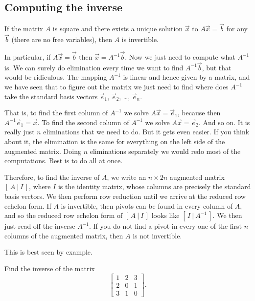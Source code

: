 \subsection{Computing the inverse}

If the matrix $A$ is square and there exists a unique solution
$\vec{x}$ to $A \vec{x} = \vec{b}$ for any $\vec{b}$ (there are no free
variables), then $A$ is invertible.

In particular, if $A \vec{x} = \vec{b}$ then $\vec{x} = A^{-1} \vec{b}$.
Now we just need to compute what $A^{-1}$ is.  We can surely 
do elimination every time we want to find $A^{-1} \vec{b}$, but that
would be ridiculous.  The mapping $A^{-1}$ is linear and
hence given by a matrix, and we have seen that to figure out the matrix
we just need to find where does $A^{-1}$ take the standard basis vectors
$\vec{e}_1$, 
$\vec{e}_2$, \ldots,
$\vec{e}_n$.

That is, to find the first column of $A^{-1}$ we solve
$A \vec{x} = \vec{e}_1$, because then $A^{-1} \vec{e}_1 = \vec{x}$.
To find the second column of $A^{-1}$ we solve
$A \vec{x} = \vec{e}_2$.  And so on.  It is really just $n$
eliminations that we need to do.  But it gets even easier.
If you think about it, the elimination is the same for
everything on the left side of the augmented matrix.  Doing
$n$ eliminations separately we would redo most of the computations.
Best is to do all at once.

Therefore, to find the inverse of $A$, we write an $n
\times 2n$ augmented matrix $[ \,A ~|~ I\, ]$, where $I$ is the identity
matrix, whose columns are precisely the standard basis vectors.
We then perform row reduction until we arrive at the reduced row echelon
form.  If $A$ is invertible, then pivots can be found in every column of $A$,
and so the 
reduced row echelon form of $[ \,A ~|~ I\, ]$ 
looks like $[ \,I ~|~ A^{-1}\, ]$.
We then just read off the inverse $A^{-1}$.
If you do not find a pivot in every
one of the first $n$ columns of the augmented matrix, then 
$A$ is not invertible.

This is best seen by example. 
\begin{example}
Find the inverse of the matrix
\begin{equation*}
\begin{bmatrix}
1 & 2 & 3 \\
2 & 0 & 1 \\
3 & 1 & 0
\end{bmatrix} .
\end{equation*}
\end{example}

